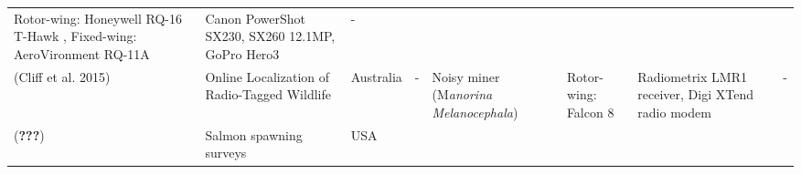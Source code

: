 \documentclass[]{interact}
\theoremstyle{plain}%
\theoremstyle{definition}
\theoremstyle{remark}
\begin{document}
\begin{longtable}[]{@{}llllllll@{}}
\begin{minipage}[t]{0.09\columnwidth}
Rotor-wing: Honeywell RQ-16 T-Hawk , Fixed-wing: AeroVironment
RQ-11A\strut
\end{minipage} & \begin{minipage}[t]{0.11\columnwidth}\raggedright\strut
Canon PowerShot SX230, SX260 12.1MP, GoPro Hero3\strut
\end{minipage} & \begin{minipage}[t]{0.01\columnwidth}\raggedright\strut
-\strut
\end{minipage}\tabularnewline
\begin{minipage}[t]{0.11\columnwidth}\raggedright\strut
(Cliff et al. 2015)\strut
\end{minipage} & \begin{minipage}[t]{0.18\columnwidth}\raggedright\strut
Online Localization of Radio-Tagged Wildlife\strut
\end{minipage} & \begin{minipage}[t]{0.03\columnwidth}\raggedright\strut
Australia\strut
\end{minipage} & \begin{minipage}[t]{0.14\columnwidth}\raggedright\strut
-\strut
\end{minipage} & \begin{minipage}[t]{0.10\columnwidth}\raggedright\strut
Noisy miner (M\emph{anorina Melanocephala})\strut
\end{minipage} & \begin{minipage}[t]{0.09\columnwidth}\raggedright\strut
Rotor-wing: Falcon 8\strut
\end{minipage} & \begin{minipage}[t]{0.11\columnwidth}\raggedright\strut
Radiometrix LMR1 receiver, Digi XTend radio modem\strut
\end{minipage} & \begin{minipage}[t]{0.01\columnwidth}\raggedright\strut
-\strut
\end{minipage}\tabularnewline
\begin{minipage}[t]{0.11\columnwidth}\raggedright\strut
({\textbf{???}})\strut
\end{minipage} & \begin{minipage}[t]{0.18\columnwidth}\raggedright\strut
Salmon spawning surveys\strut
\end{minipage} & \begin{minipage}[t]{0.03\columnwidth}\raggedright\strut
USA\strut
\end{minipage} & \begin{minipage}[t]{0.14\columnwidth}\raggedright\strut

\end{minipage}
\end{longtable}
\end{document}
